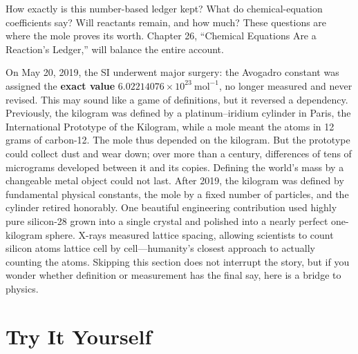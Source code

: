 How exactly is this number-based ledger kept? What do chemical-equation coefficients say? Will reactants remain, and how much? These questions are where the mole proves its worth. Chapter 26, ``Chemical Equations Are a Reaction's Ledger,'' will balance the entire account.

\begin{tiaozhan}
On May 20, 2019, the SI underwent major surgery: the Avogadro constant was assigned the \textbf{exact value} $6.02214076\times 10^{23}\ \mathrm{mol^{-1}}$, no longer measured and never revised. This may sound like a game of definitions, but it reversed a dependency. Previously, the kilogram was defined by a platinum--iridium cylinder in Paris, the International Prototype of the Kilogram, while a mole meant the atoms in 12 grams of carbon-12. The mole thus depended on the kilogram. But the prototype could collect dust and wear down; over more than a century, differences of tens of micrograms developed between it and its copies. Defining the world's mass by a changeable metal object could not last. After 2019, the kilogram was defined by fundamental physical constants, the mole by a fixed number of particles, and the cylinder retired honorably. One beautiful engineering contribution used highly pure silicon-28 grown into a single crystal and polished into a nearly perfect one-kilogram sphere. X-rays measured lattice spacing, allowing scientists to count silicon atoms lattice cell by cell---humanity's closest approach to actually counting the atoms. Skipping this section does not interrupt the story, but if you wonder whether definition or measurement has the final say, here is a bridge to physics.
\end{tiaozhan}

\section*{Try It Yourself}

